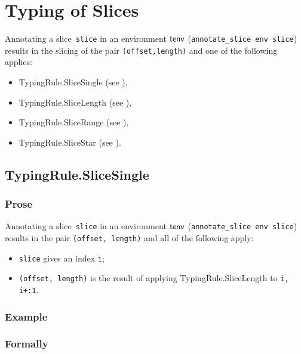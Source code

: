 \documentclass{book}
\begin{document}
\chapter{Typing of Slices \label{chap:typingslices}}

Annotating a slice~\texttt{slice} in an environment $\textsf{tenv}$
(\texttt{annotate\_slice env slice}) results in the slicing of the pair \texttt{(offset,length)} and one of the following applies:
\begin{itemize}
\item TypingRule.SliceSingle (see ),
\item TypingRule.SliceLength (see ),
\item TypingRule.SliceRange (see ),
\item TypingRule.SliceStar (see ).
\end{itemize}

\section{TypingRule.SliceSingle \label{sec:TypingRule.SliceSingle}}

  \subsection{Prose}
   Annotating a slice~\texttt{slice} in an environment $\textsf{tenv}$
(\texttt{annotate\_slice env slice}) results in the pair \texttt{(offset, length)} and all of the following apply:
   \begin{itemize}
   \item \texttt{slice} gives an index \texttt{i};
   \item \texttt{(offset, length)} is the result of applying TypingRule.SliceLength to \texttt{i, i+:1}.
   \end{itemize}

  \subsection{Example}



\begin{emptyformal}
    \subsection{Formally}
\end{emptyformal}
\end{document}
